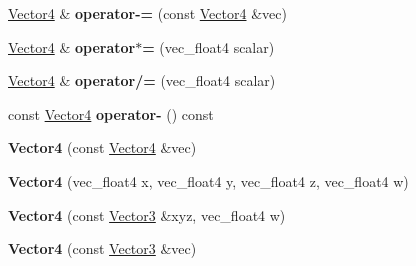 \begin{DoxyCompactItemize}
\item 
\hypertarget{classVectormath_1_1Soa_1_1Vector4_a4ccaa7538d61fac23992860d87ab92c8}{\hyperlink{classVectormath_1_1Soa_1_1Vector4}{Vector4} \& {\bfseries operator-\/=} (const \hyperlink{classVectormath_1_1Soa_1_1Vector4}{Vector4} \&vec)}\label{classVectormath_1_1Soa_1_1Vector4_a4ccaa7538d61fac23992860d87ab92c8}

\item 
\hypertarget{classVectormath_1_1Soa_1_1Vector4_a30e1c212692358caf09375c26611e82a}{\hyperlink{classVectormath_1_1Soa_1_1Vector4}{Vector4} \& {\bfseries operator$\ast$=} (vec\-\_\-float4 scalar)}\label{classVectormath_1_1Soa_1_1Vector4_a30e1c212692358caf09375c26611e82a}

\item 
\hypertarget{classVectormath_1_1Soa_1_1Vector4_a4317ad0d63c435179890975c5d1dda0e}{\hyperlink{classVectormath_1_1Soa_1_1Vector4}{Vector4} \& {\bfseries operator/=} (vec\-\_\-float4 scalar)}\label{classVectormath_1_1Soa_1_1Vector4_a4317ad0d63c435179890975c5d1dda0e}

\item 
\hypertarget{classVectormath_1_1Soa_1_1Vector4_a38e40a5f90b61ffeece42a2298819c61}{const \hyperlink{classVectormath_1_1Soa_1_1Vector4}{Vector4} {\bfseries operator-\/} () const }\label{classVectormath_1_1Soa_1_1Vector4_a38e40a5f90b61ffeece42a2298819c61}

\item 
\hypertarget{classVectormath_1_1Soa_1_1Vector4_aaea9c3da892e5251905742ded6b0e585}{{\bfseries Vector4} (const \hyperlink{classVectormath_1_1Soa_1_1Vector4}{Vector4} \&vec)}\label{classVectormath_1_1Soa_1_1Vector4_aaea9c3da892e5251905742ded6b0e585}

\item 
\hypertarget{classVectormath_1_1Soa_1_1Vector4_ad298b5e577bfcebed47f719f459fac92}{{\bfseries Vector4} (vec\-\_\-float4 x, vec\-\_\-float4 y, vec\-\_\-float4 z, vec\-\_\-float4 w)}\label{classVectormath_1_1Soa_1_1Vector4_ad298b5e577bfcebed47f719f459fac92}

\item 
\hypertarget{classVectormath_1_1Soa_1_1Vector4_ad7bffb183deb2d5adcdb0aae2c6be77c}{{\bfseries Vector4} (const \hyperlink{classVectormath_1_1Soa_1_1Vector3}{Vector3} \&xyz, vec\-\_\-float4 w)}\label{classVectormath_1_1Soa_1_1Vector4_ad7bffb183deb2d5adcdb0aae2c6be77c}

\item 
\hypertarget{classVectormath_1_1Soa_1_1Vector4_ad2b6d53e85a03711daad6673beaad26d}{{\bfseries Vector4} (const \hyperlink{classVectormath_1_1Soa_1_1Vector3}{Vector3} \&vec)}\label{classVectormath_1_1Soa_1_1Vector4_ad2b6d53e85a03711daad6673beaad26d}


\end{DoxyCompactItemize}
